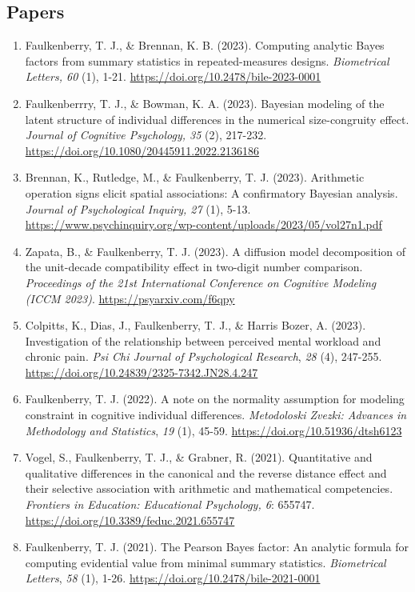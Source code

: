 \documentclass[article,10pt]{article}
\begin{document}
\subsection*{Papers}
\label{sec:org7544322}
\begin{enumerate}
\item Faulkenberry, T. J., \& Brennan, K. B. (2023). Computing analytic Bayes factors from summary statistics in repeated-measures designs. \emph{Biometrical Letters, 60} (1), 1-21. \url{https://doi.org/10.2478/bile-2023-0001}
\item Faulkenberrry, T. J., \& Bowman, K. A. (2023). Bayesian modeling of the latent structure of individual differences in the numerical size-congruity effect. \emph{Journal of Cognitive Psychology, 35} (2), 217-232. \url{https://doi.org/10.1080/20445911.2022.2136186}
\item Brennan, K., Rutledge, M., \& Faulkenberry, T. J. (2023). Arithmetic operation signs elicit spatial associations: A confirmatory Bayesian analysis. \emph{Journal of Psychological Inquiry, 27} (1), 5-13. \url{https://www.psychinquiry.org/wp-content/uploads/2023/05/vol27n1.pdf}
\item Zapata, B., \& Faulkenberry, T. J. (2023). A diffusion model decomposition of the unit-decade compatibility effect in two-digit number comparison. \emph{Proceedings of the 21st International Conference on Cognitive Modeling (ICCM 2023)}. \url{https://psyarxiv.com/f6qpy}
\item Colpitts, K., Dias, J., Faulkenberry, T. J., \& Harris Bozer, A. (2023). Investigation of the relationship between perceived mental workload and chronic pain. \emph{Psi Chi Journal of Psychological Research}, \emph{28} (4), 247-255. \url{https://doi.org/10.24839/2325-7342.JN28.4.247}
\item Faulkenberry, T. J. (2022). A note on the normality assumption for modeling constraint in cognitive individual differences. \emph{Metodoloski Zvezki: Advances in Methodology and Statistics}, \emph{19} (1), 45-59. \url{https://doi.org/10.51936/dtsh6123}
\item Vogel, S., Faulkenberry, T. J., \& Grabner, R. (2021). Quantitative and qualitative differences in the canonical and the reverse distance effect and their selective association with arithmetic and mathematical competencies. \emph{Frontiers in Education: Educational Psychology, 6}: 655747. \url{https://doi.org/10.3389/feduc.2021.655747}
\item Faulkenberry, T. J. (2021). The Pearson Bayes factor: An analytic formula for computing evidential value from minimal summary statistics. \emph{Biometrical Letters}, \emph{58} (1), 1-26. \url{https://doi.org/10.2478/bile-2021-0001}

\end{enumerate}
\end{document}

